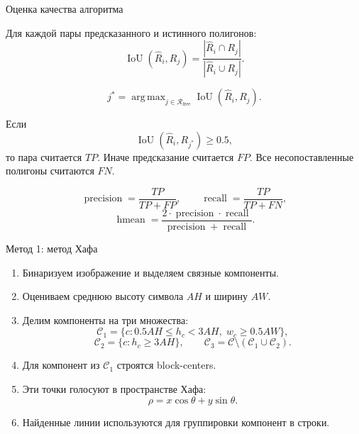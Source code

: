 \documentclass[12pt,pdf,hyperref={unicode}]{beamer}
\newcommand{\argmax}{\mathop{\mathrm{arg\,max}}}
\begin{document}
\begin{frame}{Оценка качества алгоритма}

\footnotesize
Для каждой пары предсказанного и истинного полигонов:
\[
\operatorname{IoU}(\hat{R}_i,R_j)
=
\frac{|\hat{R}_i\cap R_j|}
     {|\hat{R}_i\cup R_j|}.
\]


\[
j^*=\argmax_{j\in\mathcal{R}_{\mathrm{free}}}
\operatorname{IoU}(\hat{R}_i,R_j).
\]

Если
\[
\operatorname{IoU}(\hat{R}_i,R_{j^*})\ge 0.5,
\]
то пара считается $TP$. Иначе предсказание считается $FP$.
Все несопоставленные полигоны считаются $FN$.

\vspace{1mm}

\[
\operatorname{precision}=\frac{TP}{TP+FP},
\qquad
\operatorname{recall}=\frac{TP}{TP+FN},
\]
\[
\operatorname{hmean}
=
\frac{
2\cdot\operatorname{precision}\cdot\operatorname{recall}
}{
\operatorname{precision}+\operatorname{recall}
}.
\]

\end{frame}

\begin{frame}{Метод 1: метод Хафа}

\small

\vspace{1mm}

\begin{enumerate}
    \item Бинаризуем изображение и выделяем связные компоненты.
    \item Оцениваем среднюю высоту символа $AH$ и ширину $AW$.
    \item Делим компоненты на три множества:
    \[
    \mathcal{C}_1 = \{c: 0.5AH \le h_c < 3AH,\; w_c \ge 0.5AW\},
    \]
    \[
    \mathcal{C}_2 = \{c: h_c \ge 3AH\},
    \qquad
    \mathcal{C}_3 = \mathcal{C}\setminus(\mathcal{C}_1\cup\mathcal{C}_2).
    \]
    \item Для компонент из $\mathcal{C}_1$ строятся block-centers.
    \item Эти точки голосуют в пространстве Хафа:
    \[
        \rho = x\cos\theta + y\sin\theta.
    \]
    \item Найденные линии используются для группировки компонент в строки.
\end{enumerate}

\let\thefootnote\relax
{}

\end{frame}
\end{document}
